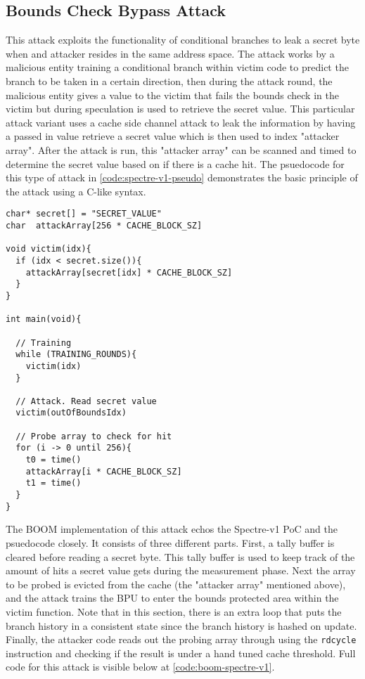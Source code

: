 \subsection{Bounds Check Bypass Attack}

This attack exploits the functionality of conditional branches to leak a secret byte 
when and attacker resides in the same address space. The attack works by a 
malicious entity training a conditional branch within victim code to predict the branch
to be taken in a certain direction, then during the attack round, the malicious entity
gives a value to the victim that fails the bounds check in the victim but during
speculation is used to retrieve the secret value. This particular attack variant
uses a cache side channel attack to leak the information by having a passed in value retrieve
a secret value which is then used to index "attacker array". After the attack is run, this 
"attacker array" can be scanned and timed to determine the secret value based on if there
is a cache hit. The psuedocode for this type of attack in \ref{code:spectre-v1-pseudo}
demonstrates the basic principle of the attack using a C-like syntax.

\begin{lstlisting}[style=column-code, caption=Psuedocode of Bounds Check Bypass Attack]
char* secret[] = "SECRET_VALUE"
char  attackArray[256 * CACHE_BLOCK_SZ]

void victim(idx){
  if (idx < secret.size()){
    attackArray[secret[idx] * CACHE_BLOCK_SZ]
  }
}

int main(void){
  
  // Training
  while (TRAINING_ROUNDS){
    victim(idx)
  }

  // Attack. Read secret value
  victim(outOfBoundsIdx)

  // Probe array to check for hit
  for (i -> 0 until 256){
    t0 = time()
    attackArray[i * CACHE_BLOCK_SZ]
    t1 = time()
  }
}
\end{lstlisting}\label{code:spectre-v1-pseudo}


The BOOM implementation of this attack echos the Spectre-v1 PoC and the psuedocode closely.
It consists of three different parts. First, a tally buffer is cleared before reading a secret byte.
This tally buffer is used to keep track of the amount of hits a secret value gets during the measurement
phase. Next the array to be probed is evicted from the cache (the "attacker array" mentioned above), and
the attack trains the BPU to enter the bounds protected area within the victim function. Note that in
this section, there is an extra loop that puts the branch history in a consistent state since the branch
history is hashed on update. Finally, the attacker code reads out the probing array through using the
{\tt rdcycle} instruction and checking if the result is under a hand tuned cache threshold. Full code for 
this attack is visible below at \ref{code:boom-spectre-v1}.


